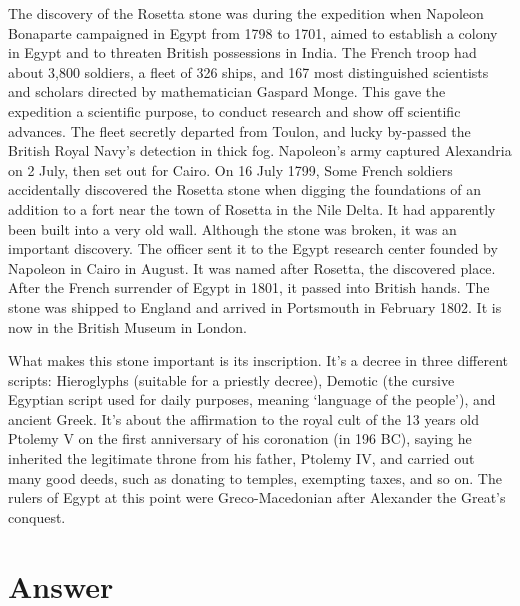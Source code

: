 \documentclass[b5paper]{article}
\begin{document}
The discovery of the Rosetta stone was during the expedition when Napoleon Bonaparte campaigned in Egypt from 1798 to 1701, aimed to establish a colony in Egypt and to threaten British possessions in India. The French troop had about 3,800 soldiers, a fleet of 326 ships, and 167 most distinguished scientists and scholars directed by mathematician Gaspard Monge\cite{Harrison-2023}. This gave the expedition a scientific purpose, to conduct research and show off scientific advances. The fleet secretly departed from Toulon, and lucky by-passed the British Royal Navy's detection in thick fog. Napoleon's army captured Alexandria on 2 July, then set out for Cairo. On 16 July 1799, Some French soldiers accidentally discovered the Rosetta stone when digging the foundations of an addition to a fort near the town of Rosetta in the Nile Delta. It had apparently been built into a very old wall. Although the stone was broken, it was an important discovery. The officer sent it to the Egypt research center founded by Napoleon in Cairo in August. It was named after Rosetta, the discovered place. After the French surrender of Egypt in 1801, it passed into British hands. The stone was shipped to England and arrived in Portsmouth in February 1802. It is now in the British Museum in London.

What makes this stone important is its inscription. It's a decree in three different scripts: Hieroglyphs (suitable for a priestly decree), Demotic (the cursive Egyptian script used for daily purposes, meaning `language of the people'), and ancient Greek. It's about the affirmation to the royal cult of the 13 years old Ptolemy V on the first anniversary of his coronation (in 196 BC), saying he inherited the legitimate throne from his father, Ptolemy IV, and carried out many good deeds, such as donating to temples, exempting taxes, and so on. The rulers of Egypt at this point were Greco-Macedonian after Alexander the Great's conquest.

\ifx\wholebook\relax \else
\section{Answer}
\shipoutAnswer
\end{document}
